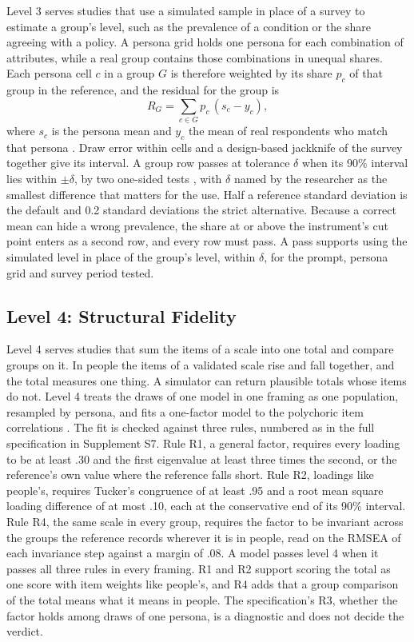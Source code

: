 Level 3 serves studies that use a simulated sample in place of a survey to estimate a group's level, such as the prevalence of a condition or the share agreeing with a policy.
A persona grid holds one persona for each combination of attributes, while a real group contains those combinations in unequal shares.
Each persona cell $c$ in a group $G$ is therefore weighted by its share $p_c$ of that group in the reference, and the residual for the group is
\begin{equation}
R_G = \sum_{c \in G} p_c\,(s_c - y_c),
\end{equation}
where $s_c$ is the persona mean and $y_c$ the mean of real respondents who match that persona \citep{holtsmith1979poststrat}.
Draw error within cells and a design-based jackknife of the survey together give its interval.
A group row passes at tolerance $\delta$ when its 90\% interval lies within $\pm\delta$, by two one-sided tests \citep{schuirmann1987tost,lakens2018tutorial}, with $\delta$ named by the researcher as the smallest difference that matters for the use.
Half a reference standard deviation is the default and 0.2 standard deviations the strict alternative.
Because a correct mean can hide a wrong prevalence, the share at or above the instrument's cut point enters as a second row, and every row must pass.
A pass supports using the simulated level in place of the group's level, within $\delta$, for the prompt, persona grid and survey period tested.

\subsection{Level 4: Structural Fidelity}
\label{sec:l4-method}

Level 4 serves studies that sum the items of a scale into one total and compare groups on it.
In people the items of a validated scale rise and fall together, and the total measures one thing.
A simulator can return plausible totals whose items do not.
Level 4 treats the draws of one model in one framing as one population, resampled by persona, and fits a one-factor model to the polychoric item correlations \citep{olsson1979polychoric}.
The fit is checked against three rules, numbered as in the full specification in Supplement S7.
Rule R1, a general factor, requires every loading to be at least .30 and the first eigenvalue at least three times the second, or the reference's own value where the reference falls short.
Rule R2, loadings like people's, requires Tucker's congruence of at least .95 \citep{lorenzoseva2006congruence} and a root mean square loading difference of at most .10, each at the conservative end of its 90\% interval.
Rule R4, the same scale in every group, requires the factor to be invariant across the groups the reference records wherever it is in people, read on the RMSEA of each invariance step \citep{savalei2024rmsea} against a margin of .08.
A model passes level 4 when it passes all three rules in every framing.
R1 and R2 support scoring the total as one score with item weights like people's, and R4 adds that a group comparison of the total means what it means in people.
The specification's R3, whether the factor holds among draws of one persona, is a diagnostic and does not decide the verdict.
